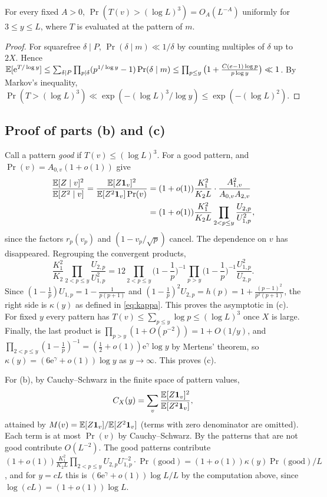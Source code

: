 \documentclass[11pt,colorlinks]{charlie}
\newcommand{\e}{\mathrm{e}}
\begin{document}
\begin{lemma}\label{lem:rare}
For every fixed $A>0$, $\Pr(T(v)>(\log L)^3)=O_A(L^{-A})$ uniformly for $3\le y\le L$, where $T$ is evaluated at the pattern of $m$.
\end{lemma}
\begin{proof}
For squarefree $\delta\mid P$, $\Pr(\delta\mid m)\ll1/\delta$ by counting multiples of $\delta$ up to $2X$. Hence $\E[\e^{T/\log y}]\le\sum_{\delta\mid P}\prod_{p\mid\delta}(p^{1/\log y}-1)\Pr(\delta\mid m)\le\prod_{p\le y}\big(1+\frac{C(e-1)\log p}{p\log y}\big)\ll1$. By Markov's inequality, $\Pr(T>(\log L)^3)\ll\exp(-(\log L)^3/\log y)\le\exp(-(\log L)^2)$.
\end{proof}

\subsection{Proof of parts (b) and (c)}
Call a pattern \emph{good} if $T(v)\le(\log L)^3$. For a good pattern,  and $\Pr(v)=A_{0,v}(1+o(1))$ give
\begin{align*}
 \frac{\mathbb{E}[Z\mid v]^2}{\mathbb{E}[Z^2\mid v]}=\frac{\mathbb{E}[Z\mathbf{1}_v]^2}{\mathbb{E}[Z^2\mathbf{1}_v]\Pr(v)}&=(1+o(1))\frac{K_1^2}{K_2L}\cdot\frac{A_{1,v}^2}{A_{0,v}A_{2,v}}\\
 &=(1+o(1))\frac{K_1^2}{K_2L}\prod_{2<p\le y}\frac{U_{2,p}}{U_{1,p}^2},
\end{align*}
since the factors $r_p(v_p)$ and $(1-v_p/\sqrt p)$ cancel. The dependence on $v$ has disappeared. Regrouping the convergent products,
\[
 \frac{K_1^2}{K_2}\prod_{2<p\le y}\frac{U_{2,p}}{U_{1,p}^2}=12\prod_{2<p\le y}\Big(1-\frac1p\Big)^{-1}\prod_{p>y}\Big(1-\frac1p\Big)^{-1}\frac{U_{1,p}^2}{U_{2,p}} .
\]
Since $(1-\frac1p)U_{1,p}=1-\frac1{p(p+1)}$ and $(1-\frac1p)^2U_{2,p}=h(p)=1+\frac{(p-1)^2}{p^2(p+1)}$, the right side is $\kappa(y)$ as defined in \eqref{eq:kappa}. This proves the asymptotic in (c). For fixed $y$ every pattern has $T(v)\le\sum_{p\le y}\log p\le(\log L)^3$ once $X$ is large. Finally, the last product is $\prod_{p>y}(1+O(p^{-2}))=1+O(1/y)$, and $\prod_{2<p\le y}(1-\frac1p)^{-1}=(\frac12+o(1))\e^\gamma\log y$ by Mertens' theorem, so $\kappa(y)=(6\e^\gamma+o(1))\log y$ as $y\to\infty$. This proves (c).

For (b), by Cauchy--Schwarz in the finite space of pattern values,
\[
 C_X(y)=\sum_v\frac{\mathbb{E}[Z\mathbf{1}_v]^2}{\mathbb{E}[Z^2\mathbf{1}_v]},
\]
attained by $M(v)=\mathbb{E}[Z\mathbf{1}_v]/\mathbb{E}[Z^2\mathbf{1}_v]$ (terms with zero denominator are omitted). Each term is at most $\Pr(v)$ by Cauchy--Schwarz. By  the patterns that are not good contribute $O(L^{-2})$. The good patterns contribute $(1+o(1))\frac{K_1^2}{K_2L}\prod_{2<p\le y}U_{2,p}U_{1,p}^{-2}\cdot\Pr(\text{good})=(1+o(1))\kappa(y)\Pr(\text{good})/L$, and for $y=cL$ this is $(6\e^\gamma+o(1))\log L/L$ by the computation above, since $\log(cL)=(1+o(1))\log L$.
\end{document}
